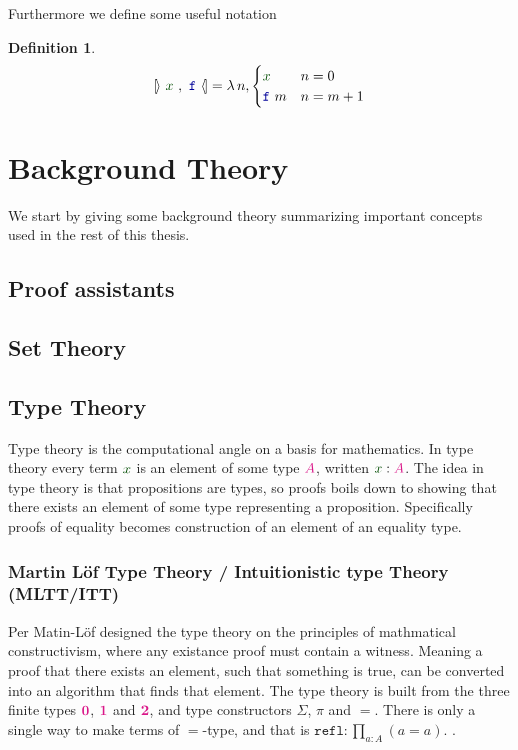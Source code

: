 \documentclass[twoside,11pt,openright]{report}
\theoremstyle{plain} %
\theoremstyle{definition}
\newtheorem{defn}{Definition}[section]
\theoremstyle{remark}
\newcommand*{\term}[1]{\textcolor{green!30!black}{#1}} %
\newcommand*{\type}[1]{\textcolor{magenta!90!black}{#1}}
\newcommand*{\unit}{\type{\textbf{1}}}
\newcommand*{\empt}{\type{\textbf{0}}}
\newcommand*{\function}[1]{\textcolor{blue!60!black}{\ensuremath{\mathtt{#1}}}}
\newcommand*{\natcases}[2]{\ensuremath{\mathbb{[\hspace{-.5mm}\rangle}~\ensuremath{#1}~,~\ensuremath{#2}~\mathbb{\langle\hspace{-.5mm}]}}}
\begin{document}
Furthermore we define some useful notation
\begin{defn}
  \begin{equation}
    \natcases{\term{x}}{\function{f}} = \lambda\,n, \begin{cases} \term{x} & n = 0 \\ \function{f}~m & n = m + 1 \end{cases}
  \end{equation}
\end{defn}



\chapter{Background Theory}
We start by giving some background theory summarizing important concepts used in the rest of this thesis.
\section{Proof assistants}
\section{Set Theory}

\section{Type Theory}
Type theory is the computational angle on a basis for mathematics. In type theory every term \(\term{x}\) is an element of some type \(\type{A}\), written \(\term{x} : \type{A}\). The idea in type theory is that propositions are types, so proofs boils down to showing that there exists an element of some type representing a proposition. Specifically proofs of equality becomes construction of an element of an equality type.

\subsection{Martin L\"of Type Theory / Intuitionistic type Theory (MLTT/ITT)}
Per Matin-L\"of designed the type theory on the principles of mathmatical constructivism, where any existance proof must contain a witness. Meaning a proof that there exists an element, such that something is true, can be converted into an algorithm that finds that element. The type theory is built from the three finite types \(\empt\), \(\unit\) and \(\type{\mathbf{2}}\), and type constructors \(\Sigma\), \(\pi\) and \(=\). There is only a single way to make terms of \(=\)-type, and that is \(\mathtt{refl} : \prod_{a : A} (a = a)\).   .
\end{document}
